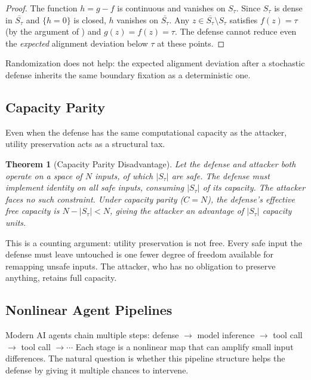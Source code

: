 \documentclass[11pt]{article}
\newtheorem{theorem}{Theorem}[section]
\newcommand{\cl}[1]{\overline{#1}}
\begin{document}
\begin{proof}
The function $h = g - f$ is continuous and vanishes on $S_\tau$. Since
$S_\tau$ is dense in $\cl{S_\tau}$ and $\{h = 0\}$ is closed, $h$
vanishes on $\cl{S_\tau}$. Any $z \in \cl{S_\tau} \setminus S_\tau$
satisfies $f(z) = \tau$ (by the argument of ) and
$g(z) = f(z) = \tau$. The defense cannot reduce even the
\emph{expected} alignment deviation below $\tau$ at these points.
\end{proof}

Randomization does not help: the expected alignment deviation after a
stochastic defense inherits the same boundary fixation as a
deterministic one.

\subsection{Capacity Parity}

Even when the defense has the same computational capacity as the
attacker, utility preservation acts as a structural tax.

\begin{theorem}[Capacity Parity Disadvantage]
\label{thm:capacity}
Let the defense and attacker both operate on a space of $N$ inputs,
of which $|S_\tau|$ are safe. The defense must implement identity on
all safe inputs, consuming $|S_\tau|$ of its capacity. The attacker
faces no such constraint. Under capacity parity ($C = N$), the
defense's effective free capacity is $N - |S_\tau| < N$, giving the
attacker an advantage of $|S_\tau|$ capacity units.
\end{theorem}

This is a counting argument: utility preservation is not free. Every
safe input the defense must leave untouched is one fewer degree of
freedom available for remapping unsafe inputs. The attacker, who has
no obligation to preserve anything, retains full capacity.

\subsection{Nonlinear Agent Pipelines}

Modern AI agents chain multiple steps: defense $\to$ model inference
$\to$ tool call $\to$ tool call $\to \cdots$ Each stage is a nonlinear
map that can amplify small input differences. The natural question is
whether this pipeline structure helps the defense by giving it multiple
chances to intervene.
\end{document}
